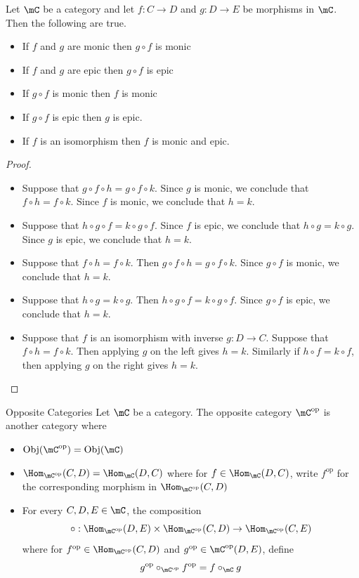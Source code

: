 \documentclass[a4paper]{article}
\begin{document}
\begin{prp}{}{} Let $\mC$ be a category and let $f:C\to D$ and $g:D\to E$ be morphisms in $\mC$. Then the following are true. 
\begin{itemize}
\item If $f$ and $g$ are monic then $g\circ f$ is monic
\item If $f$ and $g$ are epic then $g\circ f$ is epic
\item If $g\circ f$ is monic then $f$ is monic
\item If $g\circ f$ is epic then $g$ is epic. 
\item If $f$ is an isomorphism then $f$ is monic and epic. 
\end{itemize} 
\begin{proof}\\
\begin{itemize}
\item Suppose that $g\circ f\circ h=g\circ f\circ k$. Since $g$ is monic, we conclude that $f\circ h=f\circ k$. Since $f$ is monic, we conclude that $h=k$. 
\item Suppose that $h\circ g\circ f=k\circ g\circ f$. Since $f$ is epic, we conclude that $h\circ g=k\circ g$. Since $g$ is epic, we conclude that $h=k$. 
\item Suppose that $f\circ h=f\circ k$. Then $g\circ f\circ h=g\circ f\circ k$. Since $g\circ f$ is monic, we conclude that $h=k$. 
\item Suppose that $h\circ g=k\circ g$. Then $h\circ g\circ f=k\circ g\circ f$. Since $g\circ f$ is epic, we conclude that $h=k$. 
\item Suppose that $f$ is an isomorphism with inverse $g:D\to C$. Suppose that $f\circ h=f\circ k$. Then applying $g$ on the left gives $h=k$. Similarly if $h\circ f=k\circ f$, then applying $g$ on the right gives $h=k$. 
\end{itemize}
\end{proof}
\end{prp}

\begin{defn}{Opposite Categories}{} Let $\mC$ be a category. The opposite category $\mC^{\text{op}}$ is another category where
\begin{itemize}
\item $\text{Obj}(\mC^{\text{op}})=\text{Obj}(\mC)$
\item $\Hom_{\mC^{\text{op}}}(C,D)=\Hom_{\mC}(D,C)$ where for $f\in\Hom_\mC(D,C)$, write $f^{\text{op}}$ for the corresponding morphism in $\Hom_{\mC^{\text{op}}}(C,D)$
\item For every $C,D,E\in\mC$, the composition $$\circ:\Hom_{\mC^{\text{op}}}(D,E)\times\Hom_{\mC^{\text{op}}}(C,D)\to\Hom_{\mC^{\text{op}}}(C,E)$$ where for $f^{\text{op}}\in\Hom_{\mC^{\text{op}}}(C,D)$ and $g^{\text{op}}\in{\mC^{\text{op}}}(D,E)$, define $$g^{\text{op}}\circ_{\mC^{\text{op}}}f^{\text{op}}=f\circ_\mC g$$
\end{itemize}
\end{defn}
\end{document}
